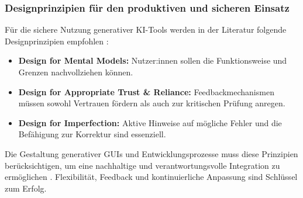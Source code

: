 \subsubsection{Designprinzipien für den produktiven und sicheren Einsatz}

Für die sichere Nutzung generativer KI-Tools werden in der Literatur folgende
Designprinzipien empfohlen \cite{weisz_design_2024}:
\begin{itemize}
    \item \textbf{Design for Mental Models:} Nutzer:innen sollen die Funktionsweise und Grenzen nachvollziehen können.
    \item \textbf{Design for Appropriate Trust \& Reliance:} Feedbackmechanismen müssen sowohl Vertrauen fördern als auch zur kritischen Prüfung anregen.
    \item \textbf{Design for Imperfection:} Aktive Hinweise auf mögliche Fehler und die Befähigung zur Korrektur sind essenziell.
\end{itemize}

Die Gestaltung generativer GUIs und Entwicklungsprozesse muss diese Prinzipien
berücksichtigen, um eine nachhaltige und verantwortungsvolle Integration zu
ermöglichen \cite{lee_towards_2025, chen_genui_2025, gill_agile_2025}.
Flexibilität, Feedback und kontinuierliche Anpassung sind Schlüssel zum Erfolg.


